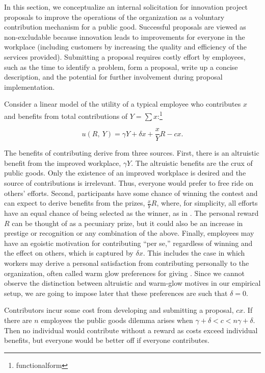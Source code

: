 \documentclass[12pt, titlepage]{article}
\begin{document}
In this section, we conceptualize an internal solicitation for
innovation project proposals to improve the operations of the
organization as a voluntary contribution mechanism for a public good.
Successful proposals are viewed as non-excludable because innovation
leads to improvements for everyone in the workplace (including customers
by increasing the quality and efficiency of the services provided).
Submitting a proposal requires costly effort by employees, such as the
time to identify a problem, form a proposal, write up a concise
description, and the potential for further involvement during proposal
implementation.

Consider a linear model of the utility of a typical employee who
contributes \(x\) and benefits from total contributions of
\(Y=\sum x\):\footnote{functionalform}

\begin{equation} \label{eq:utility}
  u(R,~ Y) =  \gamma Y + \delta x + \frac{x}{Y} R - c x.
\end{equation}

The benefits of contributing derive from three sources. First, there is
an altruistic benefit from the improved workplace, \(\gamma Y\). The
altruistic benefits are the crux of public goods. Only the existence of
an improved workplace is desired and the source of contributions is
irrelevant. Thus, everyone would prefer to free ride on others' efforts.
Second, participants have some chance of winning the contest and can
expect to derive benefits from the prizes, \(\frac{x}{Y} R\), where, for
simplicity, all efforts have an equal chance of being selected as the
winner, as in \citet{morgan2000financing}. The personal reward \(R\) can
be thought of as a pecuniary prize, but it could also be an increase in
prestige or recognition or any combination of the above. Finally,
employees may have an egoistic motivation for contributing ``per se,''
regardless of winning and the effect on others, which is captured by
\(\delta x\). This includes the case in which workers may derive a
personal satisfaction from contributing personally to the organization,
often called warm glow preferences for giving \citep{andreoni1995warm}.
Since we cannot observe the distinction between altruistic and warm-glow
motives in our empirical setup, we are going to impose later that these
preferences are such that \(\delta=0\).

Contributors incur some cost from developing and submitting a proposal,
\(c x\). If there are \(n\) employees the public goods dilemma arises
when \(\gamma+\delta < c < n\gamma+\delta\). Then no individual would
contribute without a reward as costs exceed individual benefits, but
everyone would be better off if everyone contributes.
\end{document}
